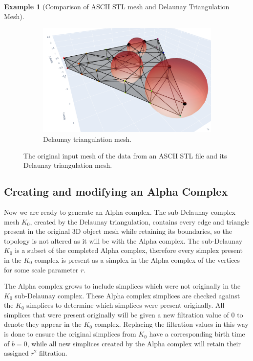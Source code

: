 \documentclass[ma]{uncgdissertationexp}
\theoremstyle{plain}
\theoremstyle{definition}
\newtheorem{example}[theorem]{Example}
\theoremstyle{remark}
\begin{document}
\begin{example}[Comparison of ASCII STL mesh and Delaunay Triangulation Mesh]
\begin{figure}[H]
\begin{subfigure}[b]{0.49\textwidth}
        \includegraphics[width=\textwidth]{Final Run, (triangular prism - triangle hole) meshpy screenshot circumsphere.png}
        \caption{Delaunay triangulation mesh.}
        \label{fig:del_circumsphere}
    \end{subfigure}
    \caption{The original input mesh of the data from an ASCII STL file and its Delaunay triangulation mesh.}
    \label{fig:delaunay_circumsphere}
\end{figure}
\end{example}

\subsection{Creating and modifying an Alpha Complex}
\label{sec:modify_alpha_complex}
\par Now we are ready to generate an Alpha complex. The sub-Delaunay complex mesh $K_{0}$, created by the Delaunay triangulation, contains every edge and triangle present in the original 3D object mesh while retaining its boundaries, so the topology is not altered as it will be with the Alpha complex. The sub-Delaunay $K_{0}$ is a subset of the completed Alpha complex, therefore every simplex present in the $K_{0}$ complex is present as a simplex in the Alpha complex of the vertices for some scale parameter $r$.
\par The Alpha complex grows to include simplices which were not originally in the $K_{0}$ sub-Delaunay complex. These Alpha complex simplices are checked against the $K_{0}$ simplices to determine which simplices were present originally. All simplices that were present originally will be given a new filtration value of 0 to denote they appear in the $K_{0}$ complex. Replacing the filtration values in this way is done to ensure the original simplices from $K_{0}$ have a corresponding birth time of $b=0$, while all new simplices created by the Alpha complex will retain their assigned $r^{2}$ filtration.
\end{document}
